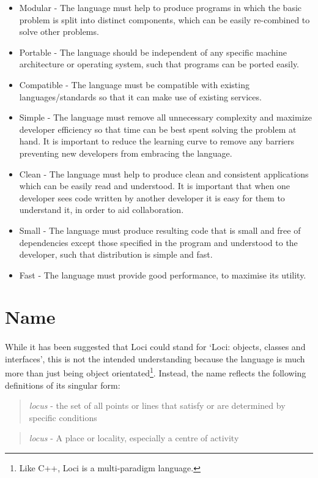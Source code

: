 \documentclass[12pt,twoside,notitlepage]{report}
\begin{document}
\begin{itemize}
\item Modular - The language must help to produce programs in which the basic problem is split into distinct components, which can be easily re-combined to solve other problems.
\item Portable - The language should be independent of any specific machine architecture or operating system, such that programs can be ported easily.
\item Compatible - The language must be compatible with existing languages/standards so that it can make use of existing services.
\item Simple - The language must remove all unnecessary complexity and maximize developer efficiency so that time can be best spent solving the problem at hand. It is important to reduce the learning curve to remove any barriers preventing new developers from embracing the language.
\item Clean - The language must help to produce clean and consistent applications which can be easily read and understood. It is important that when one developer sees code written by another developer it is easy for them to understand it, in order to aid collaboration.
\item Small - The language must produce resulting code that is small and free of dependencies except those specified in the program and understood to the developer, such that distribution is simple and fast.
\item Fast - The language must provide good performance, to maximise its utility.
\end{itemize}

\section{Name}

\paragraph{}
While it has been suggested that Loci could stand for `Loci: objects, classes and interfaces', this is not the intended understanding because the language is much more than just being object orientated\footnote{Like C++, Loci is a multi-paradigm language.}. Instead, the name reflects the following definitions of its singular form:

\begin{quotation}
\emph{locus} - the set of all points or lines that satisfy or are determined by specific conditions
\end{quotation}
\begin{quotation}
\emph{locus} - A place or locality, especially a centre of activity
\end{quotation}
\end{document}
